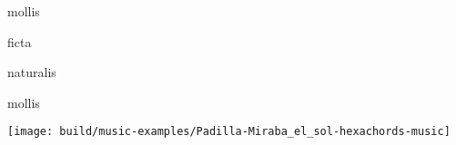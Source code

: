 \documentclass{tex/vcbook-float}
\newlength{\minim}
\begin{document}
\begin{textwidthbox}
    \hspace{2\minim}
    \noindent\begin{hexachord}{mollis}
    \end{hexachord}
    \mutate
    \begin{levelup}{1}
        \begin{hexachord}{ficta}
        \end{hexachord}
    \end{levelup}
    \mutate
    \begin{levelup}{2}
        \begin{hexachord}{naturalis}
        \end{hexachord}
    \end{levelup}
    \mutate
    \begin{hexachord}{mollis}
    \end{hexachord}
\end{textwidthbox}

\texttt{[image: build/music-examples/Padilla-Miraba\_el\_sol-hexachords-music]}
\end{document}
